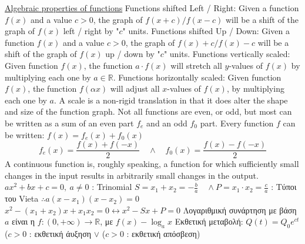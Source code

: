 \documentclass[12pt]{article}
\begin{document}
\begin{flushleft}
	\uline{Algebraic properties of functions} \linebreak 
	\textbullet \quad Functions shifted Left / Right: Given a function $f(x)$ and a value $c>0$, the graph of $f(x+c) / f(x-c)$ will be a shift of the graph of $f(x)$ left / right by "$c$" units. \linebreak 
	\textbullet \quad Functions shifted Up / Down: Given a function $f(x)$ and a value $c > 0 $, the graph of $f(x) + c / f(x) - c$ will be a shift of the graph of $f(x)$ up / down by "$c$" units. \linebreak 
	\textbullet \quad Functions vertically scaled: Given function $f(x)$, the function $a\cdot f(x)$ will stretch all $y$-values of $f(x)$ by multiplying each one by $a \in \mathbb{R}$. \linebreak 
	\textbullet \quad Functions horizontally scaled: Given function $f(x)$, the function $f(\alpha x)$ will adjust all $x$-values of $f(x)$, by multiplying each one by $a$. \linebreak 
	\textbullet \quad A scale is a non-rigid translation in that it does alter the shape and size of the function graph. \linebreak 
	\textbullet \quad Not all functions are even, or odd, but most can be written as a sum of an even part $f_e$ and an odd $f_0$ part. Every function $f$ can be written: $\displaystyle f(x) = f_e(x) + f_0(x)$ \linebreak 
	$$f_e(x) = \frac{f(x) + f(-x)}{2} \quad \land \quad f_0(x) = \frac{f(x) - f(-x)}{2} $$ 
	\textbullet \quad A continuous function is, roughly speaking, a function for which sufficiently small changes in the input results in arbitrarily small changes in the output. \linebreak 
	\textbullet \quad $ax^2 + bx +c = 0, \ a\neq 0$  :  Trinomial \linebreak 
	$\displaystyle S = x_1 + x_2 = -\frac{b}{a} \quad \land P = x_1 \cdot x_2 = \frac{c}{a} $  :  \textgreek{Τύποι του} Vieta \linebreak 
	$\displaystyle \therefore a(x-x_1)(x-x_2) = 0$ \linebreak 
	$\displaystyle x^2 -(x_1 + x_2) x + x_1 x_2 = 0 \leftrightarrow x^2 - Sx + P = 0 $ \linebreak 
	\textbullet \quad \textgreek{Λογαριθμική συνάρτηση με βάση} $a$ \textgreek{είναι η} $\displaystyle f:(0,+\infty) \rightarrow \mathbb{R}$, \textgreek{με} $\displaystyle f(x) - \log_a x$ \linebreak 
	\textbullet \quad \textgreek{Εκθετική μεταβολή}: $\displaystyle Q(t) = Q_0 e^{ct}$ \qquad ($c>0$  :  \textgreek{εκθετική άυξηση} $ \lor $ ($c>0$  :  \textgreek{εκθετική απόσβεση}) \linebreak 

\end{flushleft}
\end{document}
